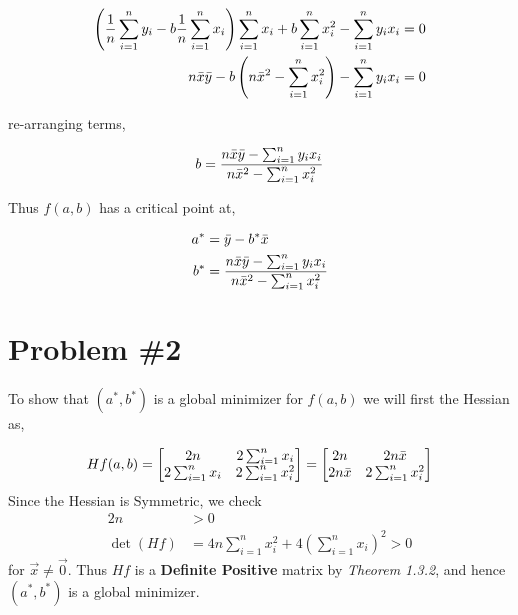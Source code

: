 \documentclass{article}
\begin{document}
\begin{align*}
    \left(\frac{1}{n}\sum_{i=1}^ny_i - b \frac{1}{n}\sum_{i=1}^nx_i \right)\sum_{i=1}^nx_i + b\sum_{i=1}^nx_i^2 - \sum_{i=1}^ny_ix_i &= 0 \\
    n\Bar{x}\Bar{y} - b\left(n\Bar{x}^2 - \sum_{i=1}^nx_i^2 \right) - \sum_{i=1}^ny_ix_i &= 0
\end{align*}

re-arranging terms,

\begin{equation*}
    b = \frac{n\Bar{x}\Bar{y}- \sum_{i=1}^ny_ix_i}{n\Bar{x}^2 - \sum_{i=1}^nx_i^2}
\end{equation*}

Thus $f(a,b)$ has a critical point at,

\begin{align*}
    a^* &= \Bar{y} - b^*\Bar{x}\\
    b^* &=\frac{n\Bar{x}\Bar{y}- \sum_{i=1}^ny_ix_i}{n\Bar{x}^2 - \sum_{i=1}^nx_i^2}
\end{align*}

\section*{Problem \#2}
To show that $(a^*,b^*)$ is a global minimizer for $f(a,b)$ we will first the Hessian as,

\begin{equation*}
    Hf(a,b) = \begin{bmatrix}
        2n & 2\sum_{i=1}^nx_i \\ 2\sum_{i=1}^nx_i & 2\sum_{i=1}^nx_i^2
    \end{bmatrix} = \begin{bmatrix}
        2n & 2n\Bar{x} \\
        2n\Bar{x} & 2\sum_{i=1}^nx_i^2
    \end{bmatrix}
\end{equation*}
Since the Hessian is Symmetric, we check
\begin{align*}
    2n &> 0 \\
    \det(Hf) &= 4n \sum_{i=1}^nx_i^2 + 4 \left( \sum_{i=1}^nx_i\right)^2 > 0
\end{align*}
for $\vec{x} \neq \vec{0}$. Thus $Hf$ is a \textbf{Definite Positive} matrix by \textit{Theorem 1.3.2}, and hence $(a^*,b^*)$ is a global minimizer.
\end{document}
